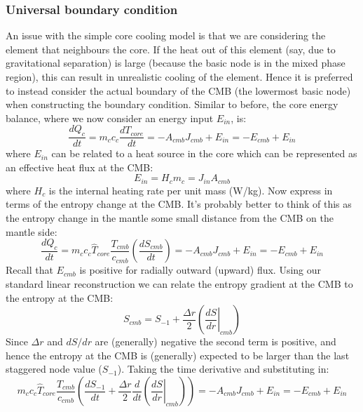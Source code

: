 \subsubsection{Universal boundary condition}
\label{sec:corecool2}
An issue with the simple core cooling model is that we are considering the element that neighbours the core.  If the heat out of this element (say, due to gravitational separation) is large (because the basic node is in the mixed phase region), this can result in unrealistic cooling of the element.  Hence it is preferred to instead consider the actual boundary of the CMB (the lowermost basic node) when constructing the boundary condition.  Similar to before, the core energy balance, where we now consider an energy input $E_{in}$, is:
\begin{equation}
\frac{dQ_c}{dt} = m_c c_c \frac{dT_{core}}{dt} = -A_{cmb} J_{cmb} + E_{in} = -E_{cmb} + E_{in}
\label{eq:core_energy_balanceII}
\end{equation}
where $E_{in}$ can be related to a heat source in the core which can be represented as an effective heat flux at the CMB:
\begin{equation}
E_{in} = H_c m_c = J_{in} A_{cmb}
\end{equation}
where $H_c$ is the internal heating rate per unit mass (W/kg).  Now express in terms of the entropy change at the CMB.  It's probably better to think of this as the entropy change in the mantle some small distance from the CMB on the mantle side:
\begin{equation}
\frac{dQ_c}{dt} = m_c c_c \hat{T}_{core} \frac{T_{cmb}}{c_{cmb}} \left( \frac{dS_{cmb}}{dt} \right) = -A_{cmb} J_{cmb} + E_{in} = -E_{cmb} + E_{in}
\end{equation}
Recall that $E_{cmb}$ is positive for radially outward (upward) flux.  Using our standard linear reconstruction we can relate the entropy gradient at the CMB to the entropy at the CMB:
\begin{equation}
S_{cmb} = S_{-1} + \frac{\Delta r}{2} \left( \left. \frac{dS}{dr} \right |_{cmb} \right)
\end{equation}
Since $\Delta r$ and $dS/dr$ are (generally) negative the second term is positive, and hence the entropy at the CMB is (generally) expected to be larger than the last staggered node value ($S_{-1}$).  Taking the time derivative and substituting in:
\begin{equation}
m_c c_c \hat{T}_{core} \frac{T_{cmb}}{c_{cmb}} \left( \frac{dS_{-1}}{dt} + \frac{\Delta r}{2} \frac{d}{dt} \left( \left. \frac{dS}{dr} \right |_{cmb} \right)  \right) = -A_{cmb} J_{cmb} + E_{in} = -E_{cmb} + E_{in}
\end{equation}

